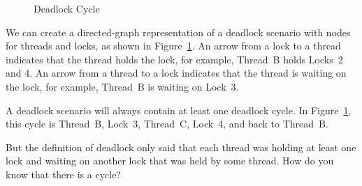 \begin{figure}[tb]
\begin{center}
\end{center}
\caption{Deadlock Cycle}
\label{fig:locking:Deadlock Cycle}
\end{figure}

We can create a directed-graph representation of a deadlock scenario
with nodes for threads and locks, as shown in
Figure~\ref{fig:locking:Deadlock Cycle}.
An arrow from a lock to a thread indicates that the thread holds
the lock, for example, Thread~B holds Locks~2 and 4.
An arrow from a thread to a lock indicates that the thread is waiting
on the lock, for example, Thread~B is waiting on Lock~3.

A deadlock scenario will always contain at least one deadlock cycle.
In Figure~\ref{fig:locking:Deadlock Cycle}, this cycle is
Thread~B, Lock~3, Thread~C, Lock~4, and back to Thread~B.

\QuickQuiz{}
	But the definition of deadlock only said that each thread
	was holding at least one lock and waiting on another lock
	that was held by some thread.
	How do you know that there is a cycle?
 \QuickQuizEnd

